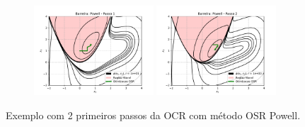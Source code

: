 \documentclass[10pt, a4paper]{article}
\begin{document}
\begin{figure}[H]
  \centering
  \begin{subfigure}[b]{\textwidth}
    \includegraphics[width=0.49\textwidth]{fig_p1/Barreira_Powell_1.pdf}
    \includegraphics[width=0.49\textwidth]{fig_p1/Barreira_Powell_2.pdf}
  \end{subfigure}
  \caption{Exemplo com 2 primeiros passos da OCR com método OSR Powell. }
\end{figure}
\end{document}
